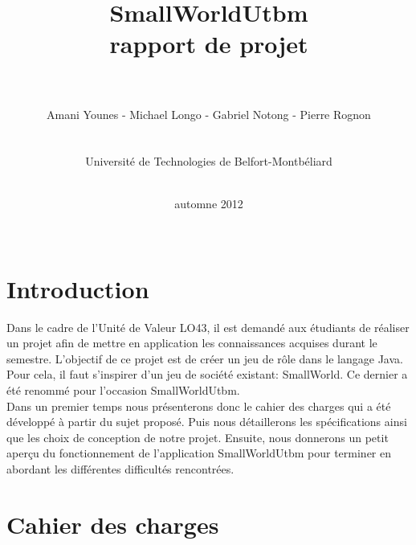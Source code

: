 \documentclass[a4paper, 11pt]{article}
\title{\vspace{5cm}SmallWorldUtbm \\ rapport de projet \\ \ \\}
\date{automne 2012\\ \ \\}
\author{Amani Younes - Michael Longo - Gabriel Notong - Pierre Rognon \\ \ \\ \ \\ Université de Technologies de Belfort-Montbéliard\\ \ \\}
\begin{document}
	
	\maketitle
	
	\newpage
	
	\tableofcontents
	
	\newpage
	
	\section{Introduction}
	
	Dans le cadre de l’Unité de Valeur LO43, il est demandé aux étudiants de réaliser un projet afin de mettre en application les connaissances acquises durant le semestre. L'objectif de ce projet est de créer un jeu de rôle dans le langage Java. Pour cela, il faut s'inspirer d'un jeu de société existant: SmallWorld. Ce dernier a été renommé pour l'occasion SmallWorldUtbm.\\
	Dans un premier temps nous présenterons donc le cahier des charges qui a été développé à partir du sujet proposé. Puis nous détaillerons les spécifications ainsi que les choix de conception de notre projet. Ensuite, nous donnerons un petit aperçu du fonctionnement de l'application SmallWorldUtbm pour terminer en abordant les différentes difficultés rencontrées.
	
	\newpage
	
	\section{Cahier des charges}
	
\end{document}

